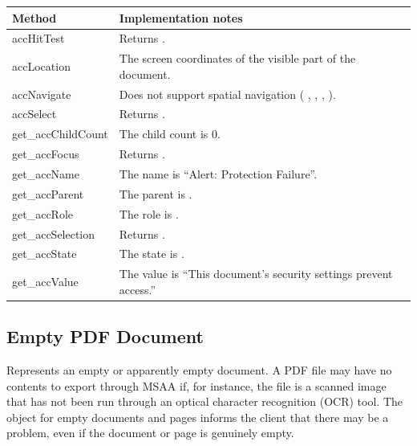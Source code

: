 \documentclass[letterpaper,12pt,english,openany,oneside]{sphinxmanual}
\begin{document}
\begin{savenotes}\sphinxattablestart
\centering
{}\label{\detokenize{MSAA_PDF:section-19}}\nobreak
\begin{tabulary}{\linewidth}[t]{|T|T|}
\hline
\sphinxstyletheadfamily 
Method
&\sphinxstyletheadfamily 
Implementation notes
\\
\hline
accHitTest
&
Returns  .
\\
\hline
accLocation
&
The screen coordinates of the visible part of the document.
\\
\hline
accNavigate
&
Does not support spatial navigation ( ,  ,  ,  ).
\\
\hline
accSelect
&
Returns  .
\\
\hline
get\_accChildCount
&
The child count is 0.
\\
\hline
get\_accFocus
&
Returns  .
\\
\hline
get\_accName
&
The name is “Alert: Protection Failure”.
\\
\hline
get\_accParent
&
The parent is  .
\\
\hline
get\_accRole
&
The role is  .
\\
\hline
get\_accSelection
&
Returns  .
\\
\hline
get\_accState
&
The state is  .
\\
\hline
get\_accValue
&
The value is “This document’s security settings prevent access.”
\\
\hline
\end{tabulary}
\par
\sphinxattableend\end{savenotes}




\subsection{Empty PDF Document}
\label{\detokenize{MSAA_PDF:empty-pdf-document}}
Represents an empty or apparently empty document. A PDF file may have no contents to export through MSAA if, for instance, the file is a scanned image that has not been run through an optical character recognition (OCR) tool. The  object for empty documents and pages informs the client that there may be a problem, even if the document or page is genuinely empty.
\end{document}

